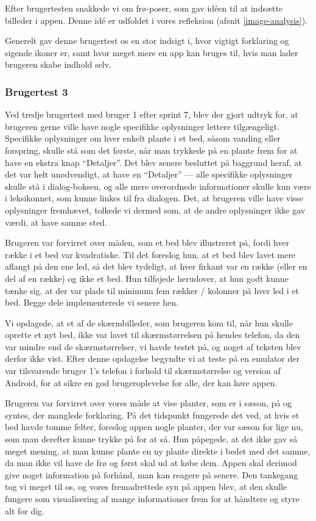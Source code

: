 Efter brugertesten snakkede vi om frø-poser, som gav idéen til at indsætte billeder i appen. Denne idé er udfoldet i vores refleksion (afsnit \ref{image-analysis}).

Generelt gav denne brugertest os en stor indsigt i, hvor vigtigt forklaring og sigende ikoner er, samt hvor meget mere en app kan bruges til, hvis man lader brugeren skabe indhold selv.

\subsubsection{Brugertest 3}

Ved tredje brugertest med bruger 1 efter sprint 7, blev der gjort udtryk for, at brugeren gerne ville have nogle specifikke oplysninger lettere tilgængeligt. Specifikke oplysninger om hver enkelt plante i et bed, såsom vanding eller forspring, skulle stå som det første, når man trykkede på en plante frem for at have en ekstra knap ``Detaljer''. Det blev senere besluttet på baggrund heraf, at det var helt unødvendigt, at have en ``Detaljer'' --- alle specifikke oplysninger skulle stå i dialog-boksen, og alle mere overordnede informationer skulle kun være i leksikonnet, som kunne linkes til fra dialogen. Det, at brugeren ville have visse oplysninger fremhævet, tolkede vi dermed som, at de andre oplysninger ikke gav værdi, at have samme sted.

Brugeren var forvirret over måden, som et bed blev illustreret på, fordi hver række i et bed var kvadratiske. Til det foreslog hun, at et bed blev lavet mere aflangt på den ene led, så det blev tydeligt, at hver firkant var en række (eller en del af en række) og ikke et bed. Hun tilføjede herudover, at hun godt kunne tænke sig, at der var plads til minimum fem rækker / kolonner på hver led i et bed. Begge dele implementerede vi senere hen.

Vi opdagede, at et af de skærmbilleder, som brugeren kom til, når hun skulle oprette et nyt bed, ikke var lavet til skærmstørrelsen på hendes telefon, da den var mindre end de skærmstørrelser, vi havde testet på, og noget af teksten blev derfor ikke vist. Efter denne opdagelse begyndte vi at teste på en emulator der var tilsvarende bruger 1's telefon i forhold til skærmstørrelse og version af Android, for at sikre en god brugeroplevelse for alle, der kan køre appen.

Brugeren var forvirret over vores måde at vise planter, som er i sæson, på og syntes, der manglede forklaring. På det tidspunkt fungerede det ved, at hvis et bed havde tomme felter, foreslog appen nogle planter, der var sæson for lige nu, som man derefter kunne trykke på for at så. Hun påpegede, at det ikke gav så meget mening, at man kunne plante en ny plante direkte i bedet med det samme, da man ikke vil have de frø og først skal ud at købe dem. Appen skal derimod give noget information på forhånd, man kan reagere på senere. Den tankegang tog vi meget til os, og vores fremadrettede syn på appen blev, at den skulle fungere som visualisering af mange informationer frem for at håndtere og styre alt for dig.

